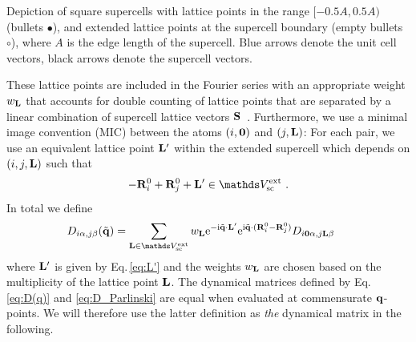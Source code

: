 \begin{marginfigure}[0cm]
	\caption{Depiction of square supercells with lattice points in the range $[-0.5 A, 0.5 A)$ (bullets $\bullet$), and extended lattice points at the supercell boundary (empty bullets $\circ$), where $A$ is the edge length of the supercell. Blue arrows denote the unit cell vectors, black arrows denote the supercell vectors.}
	\label{fig:sketch_supercells}
\end{marginfigure}
These lattice points are included in the Fourier series with an appropriate weight $w_{{\bf L}}$ that accounts for double counting of lattice points that are separated by a linear combination of supercell lattice vectors $\bf S$~\cite{Parlinski1997}. Furthermore, we use a minimal image convention (MIC) between the atoms $(i, {\bf 0})$ and $(j, {\bf L})$: For each pair, we use an equivalent lattice point ${\bf L}'$ within the extended supercell which depends on $(i, j, {\bf L})$ such that
\begin{align}
	- \b R_{i}^0 + \b R_{j}^0 + \b L' \in \mathds V_{\rm sc}^{\rm ext}~.
	\label{eq:L'}
\end{align}
In total we define
\begin{align}
	{D}_{i \alpha, j \beta} (\tilde{\b q}) 	
		&= %
		\sum_{\b L \in \mathds V_{\rm sc}^{\rm ext}} 
			w_{\b L}
		{\rm e}^{- \im \tilde{\b q} \cdot \b L'} {\rm e}^{\im \tilde{\b q} \cdot (\b R_i^0 - \b R_j^0)} {D}_{i \b 0 \alpha, j \b L \beta}~
	\label{eq:D_Parlinski}
\end{align}
where ${\bf L}'$ is given by Eq.\,\eqref{eq:L'} and the weights $w_{{\bf L}}$ are chosen based on the multiplicity of the lattice point ${\bf L}$. The dynamical matrices defined by Eq.\,\eqref{eq:D(q)} and \eqref{eq:D_Parlinski} are equal when evaluated at commensurate $\bf q$-points. We will therefore use the latter definition as \emph{the} dynamical matrix in the following.

